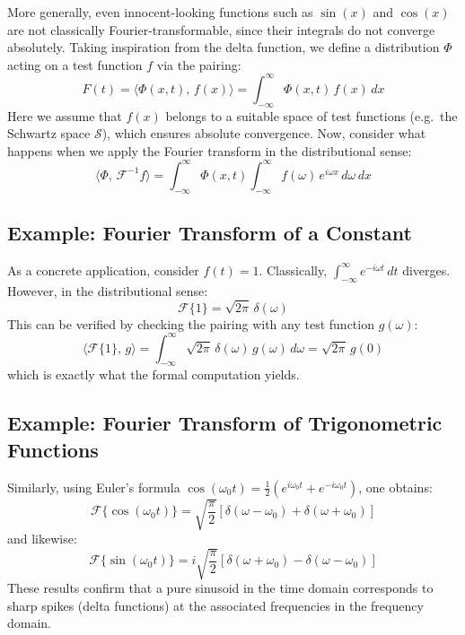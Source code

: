 \documentclass[]{article}
\begin{document}
More generally, even innocent-looking functions such as $\sin(x)$ and $\cos(x)$ are not classically Fourier-transformable, since their integrals do not converge absolutely. Taking inspiration from the delta function, we define a distribution $\Phi$ acting on a test function $f$ via the pairing:
\[F(t)= \langle \Phi(x,t),\, f(x) \rangle = \int_{-\infty}^{\infty} \Phi(x,t)\,f(x)\,dx\]
Here we assume that $f(x)$ belongs to a suitable space of test functions (e.g.\ the Schwartz space $\mathcal{S}$), which ensures absolute convergence. Now, consider what happens when we apply the Fourier transform in the distributional sense:
\[\langle \Phi,\,\mathcal{F}^{-1}f \rangle = \int_{-\infty}^{\infty} \Phi(x,t) \int_{-\infty}^{\infty}f(\omega)\,e^{i\omega x}\, d\omega\, dx\] 

\subsection{Example: Fourier Transform of a Constant}

As a concrete application, consider $f(t) = 1$. Classically, $\int_{-\infty}^{\infty} e^{-i\omega t}\,dt$ diverges. However, in the distributional sense:
\[\mathcal{F}\{1\} = \sqrt{2\pi}\,\delta(\omega)\]
This can be verified by checking the pairing with any test function $g(\omega)$:
\[\langle \mathcal{F}\{1\},\, g \rangle = \int_{-\infty}^{\infty} \sqrt{2\pi}\,\delta(\omega)\,g(\omega)\,d\omega = \sqrt{2\pi}\,g(0)\]
which is exactly what the formal computation yields.

\subsection{Example: Fourier Transform of Trigonometric Functions}

Similarly, using Euler's formula $\cos(\omega_0 t) = \frac{1}{2}(e^{i\omega_0 t} + e^{-i\omega_0 t})$, one obtains:
\[\mathcal{F}\{\cos(\omega_0 t)\} = \sqrt{\frac{\pi}{2}}\left[\delta(\omega - \omega_0) + \delta(\omega + \omega_0)\right]\]
and likewise:
\[\mathcal{F}\{\sin(\omega_0 t)\} = i\sqrt{\frac{\pi}{2}}\left[\delta(\omega + \omega_0) - \delta(\omega - \omega_0)\right]\]
These results confirm that a pure sinusoid in the time domain corresponds to sharp spikes (delta functions) at the associated frequencies in the frequency domain.
\end{document}
